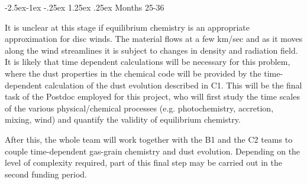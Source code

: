 \documentclass[10pt,fleqn,twoside]{article}
\makeatletter
\renewcommand\paragraph{\@startsection{paragraph}{4}{\z@}%
            {-2.5ex\@plus -1ex \@minus -.25ex}%
            {1.25ex \@plus .25ex}%
            {\normalfont\normalsize\bfseries}}
\makeatother
\begin{document}
\paragraph{Months 25-36}

 It is unclear at this stage if equilibrium chemistry is an appropriate approximation for disc winds. The material flows at a few km/sec and as it moves along the wind streamlines it is subject to changes in density and radiation field. It is likely that time  dependent calculations will be necessary for this problem, where the dust properties in the chemical code will be provided by the time-dependent calculation of the dust evolution described in C1. This will be the final task of the Postdoc employed for this project, who will first study the time scales of the various physical/chemical processes (e.g. photochemistry, accretion, mixing, wind) and quantify the validity of equilibrium chemistry.

After this, the whole team will work together with the B1 and the C2 teams to couple time-dependent gas-grain chemistry and dust evolution.  Depending on the level of complexity required, part of this final step may be carried out in the second funding period.
\end{document}
